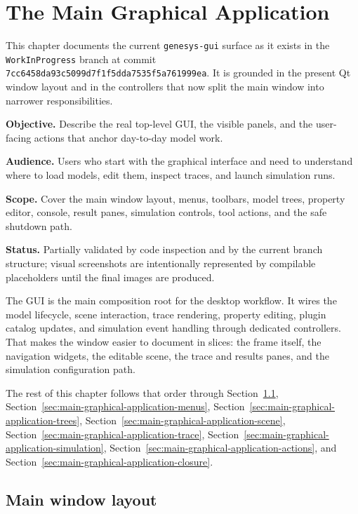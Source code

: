 \chapter{The Main Graphical Application}
\label{chap:main-graphical-application}

This chapter documents the current \texttt{genesys-gui} surface as it exists
in the \texttt{WorkInProgress} branch at commit
\texttt{7cc6458da93c5099d7f1f5dda7535f5a761999ea}. It is grounded in the
present Qt window layout and in the controllers that now split the main window
into narrower responsibilities.

\noindent\textbf{Objective.} Describe the real top-level GUI, the visible
panels, and the user-facing actions that anchor day-to-day model work.

\noindent\textbf{Audience.} Users who start with the graphical interface and
need to understand where to load models, edit them, inspect traces, and launch
simulation runs.

\noindent\textbf{Scope.} Cover the main window layout, menus, toolbars, model
trees, property editor, console, result panes, simulation controls, tool
actions, and the safe shutdown path.

\noindent\textbf{Status.} Partially validated by code inspection and by the
current branch structure; visual screenshots are intentionally represented by
compilable placeholders until the final images are produced.

The GUI is the main composition root for the desktop workflow. It wires the
model lifecycle, scene interaction, trace rendering, property editing, plugin
catalog updates, and simulation event handling through dedicated controllers.
That makes the window easier to document in slices: the frame itself, the
navigation widgets, the editable scene, the trace and results panes, and the
simulation configuration path.

The rest of this chapter follows that order through
Section~\ref{sec:main-graphical-application-layout},
Section~\ref{sec:main-graphical-application-menus},
Section~\ref{sec:main-graphical-application-trees},
Section~\ref{sec:main-graphical-application-scene},
Section~\ref{sec:main-graphical-application-trace},
Section~\ref{sec:main-graphical-application-simulation},
Section~\ref{sec:main-graphical-application-actions}, and
Section~\ref{sec:main-graphical-application-closure}.

\section{Main window layout}
\label{sec:main-graphical-application-layout}

